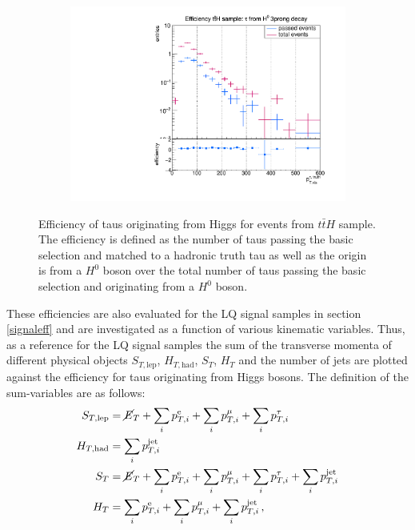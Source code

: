 \begin{figure}
\begin{subfigure}[t]{0.49\textwidth}
                \label{DividedFromH:bg:1prong}
                \end{subfigure}
                \begin{subfigure}[t]{0.49\textwidth}
                \includegraphics[width=\textwidth]{figures/plots/ttH/Divided_fromH3prong.pdf}
                \label{DividedFromH:bg:3prong}
                \end{subfigure}
\caption[Efficiency of taus originating from Higgs bosons for events from $t\bar{t}H$ sample.]{Efficiency of taus originating from Higgs for events from $t\bar{t}H$ sample. The efficiency is defined as the number of taus passing the basic selection and matched to a hadronic truth tau as well as the origin is from a $H^0$ boson over the total number of taus passing the basic selection and originating from a $H^0$ boson.}
\label{DividedFromH:bg:ttH}
\end{figure}
%
These efficiencies are also evaluated for the LQ signal samples in section \ref{signaleff} and are investigated as a function of various kinematic variables.%
Thus, as a reference for the LQ signal samples the sum of the transverse momenta of different physical objects $S_{T,\text{lep}}$, $H_{T,\text{had}}$, $S_{T}$, $H_{T}$ and the number of jets are plotted against the efficiency for taus originating from Higgs bosons. The definition of the sum-variables are as follows:
\begin{align}
S_{T,\text{lep}}&=\cancel{E}_{T}+\sum_i p_{T,i}^{\text{e}}+\sum_i p_{T,i}^{\mu}+\sum_i p_{T,i}^{\tau} \label{STlepgedöns}\\
H_{T,\text{had}}&=\sum_i p_{T,i}^{\text{jet}} \label{HThadgedöns}\\
S_{T}&=\cancel{E}_{T}+\sum_i p_{T,i}^{\text{e}}+\sum_i p_{T,i}^{\mu}+\sum_i p_{T,i}^{\tau}+\sum_i p_{T,i}^{\text{jet}} \label{STgedöns}\\
H_{T}&=\sum_i p_{T,i}^{\text{e}}+\sum_i p_{T,i}^{\mu}+\sum_i p_{T,i}^{\text{jet}}\,\text{,}
\label{HTgedöns}
\end{align}
